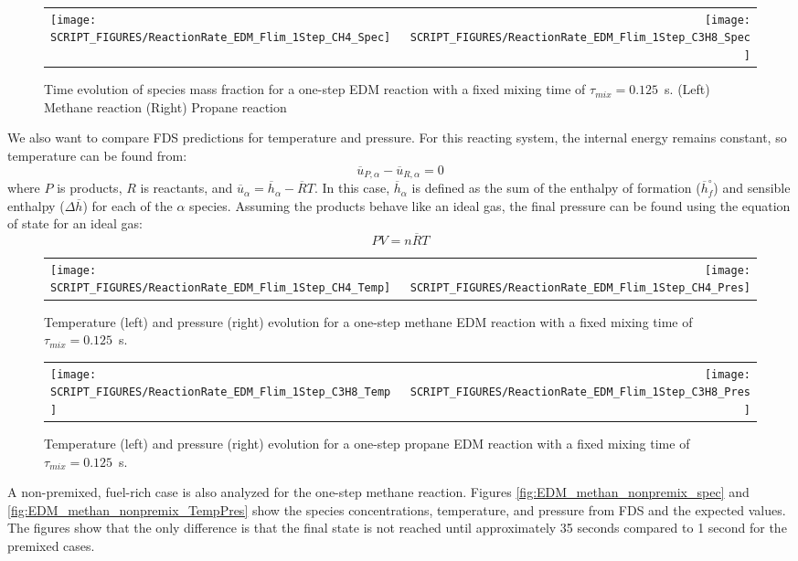 \documentclass[11pt]{book}
\begin{document}
\begin{figure}[ht]
\begin{tabular*}{\textwidth}{lr}
\texttt{[image: SCRIPT\_FIGURES/ReactionRate\_EDM\_Flim\_1Step\_CH4\_Spec]} &
\texttt{[image: SCRIPT\_FIGURES/ReactionRate\_EDM\_Flim\_1Step\_C3H8\_Spec]}
\end{tabular*}
\caption[Species Evolution in Mixing Controlled Reaction]{Time evolution of species mass fraction for a one-step EDM reaction with a fixed mixing time of $\tau_{mix}=0.125$~s. (Left) Methane reaction (Right) Propane reaction}
\label{fig:EDM_1Step}
\end{figure}
We also want to compare FDS predictions for temperature and pressure. For this reacting system, the internal energy remains constant, so temperature can be found from:
\begin{equation}\label{eq:del_u}
\overline{u}_{P,\alpha} - \overline{u}_{R,\alpha} = 0
\end{equation}
where $P$ is products, $R$ is reactants, and $\overline{u}_{\alpha}=\overline{h}_{\alpha}-\overline{R}T$. In this case, $\overline{h}_{\alpha}$ is defined as the sum of the enthalpy of formation ($\overline{h}_{f}^{\circ}$) and sensible enthalpy ($\Delta \overline{h}$) for each of the $\alpha$ species. Assuming the products behave like an ideal gas, the final pressure can be found using the equation of state for an ideal gas:
\begin{equation}\label{eq:ideal_gas}
PV = n\overline{R}T
\end{equation}

\begin{figure}[ht]
\begin{tabular*}{\textwidth}{lr}
\texttt{[image: SCRIPT\_FIGURES/ReactionRate\_EDM\_Flim\_1Step\_CH4\_Temp]} &
\texttt{[image: SCRIPT\_FIGURES/ReactionRate\_EDM\_Flim\_1Step\_CH4\_Pres]}
\end{tabular*}
\caption[Temperature Evolution in Mixing Controlled Reaction]{Temperature (left) and pressure (right) evolution for a one-step methane EDM reaction with a fixed mixing time of $\tau_{mix}=0.125$~s.}
\label{fig:EDM_Methane_TempPres}
\end{figure}

\begin{figure}[ht]
\begin{tabular*}{\textwidth}{lr}
\texttt{[image: SCRIPT\_FIGURES/ReactionRate\_EDM\_Flim\_1Step\_C3H8\_Temp]} &
\texttt{[image: SCRIPT\_FIGURES/ReactionRate\_EDM\_Flim\_1Step\_C3H8\_Pres]}
\end{tabular*}
\caption[Temperature Evolution in Mixing Controlled Reaction]{Temperature (left) and pressure (right) evolution for a one-step propane EDM reaction with a fixed mixing time of $\tau_{mix}=0.125$~s.}
\label{fig:EDM_Propane_TempPres}
\end{figure}
A non-premixed, fuel-rich case is also analyzed for the one-step methane reaction. Figures \ref{fig:EDM_methan_nonpremix_spec} and \ref{fig:EDM_methan_nonpremix_TempPres} show the species concentrations, temperature, and pressure from FDS and the expected values. The figures show that the only difference is that the final state is not reached until approximately 35 seconds compared to 1 second for the premixed cases.
\end{document}

